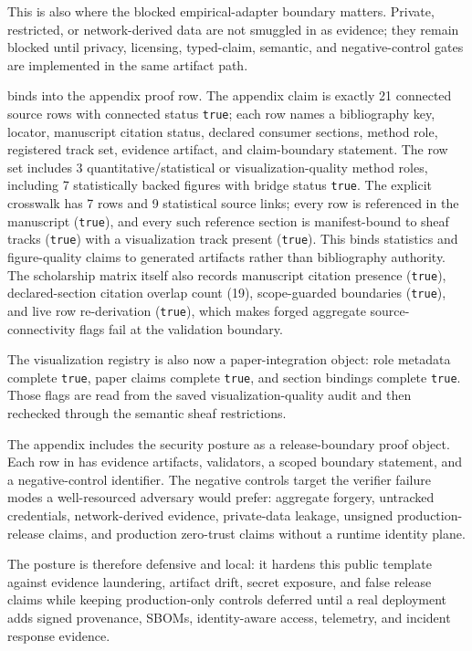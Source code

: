 \documentclass[
  english,
]{article}
\begin{document}
This is also where the blocked empirical-adapter boundary matters.
Private, restricted, or network-derived data are not smuggled in as
evidence; they remain blocked until privacy, licensing, typed-claim,
semantic, and negative-control gates are implemented in the same
artifact path.

 binds
 into the appendix
proof row. The appendix claim is exactly 21 connected source rows with
connected status \texttt{true}; each row names a bibliography key,
locator, manuscript citation status, declared consumer sections, method
role, registered track set, evidence artifact, and claim-boundary
statement. The row set includes 3 quantitative/statistical or
visualization-quality method roles, including 7 statistically backed
figures with bridge status \texttt{true}. The explicit crosswalk has 7
rows and 9 statistical source links; every row is referenced in the
manuscript (\texttt{true}), and every such reference section is
manifest-bound to sheaf tracks (\texttt{true}) with a visualization
track present (\texttt{true}). This binds statistics and figure-quality
claims to generated artifacts rather than bibliography authority. The
scholarship matrix itself also records manuscript citation presence
(\texttt{true}), declared-section citation overlap count (19),
scope-guarded boundaries (\texttt{true}), and live row re-derivation
(\texttt{true}), which makes forged aggregate source-connectivity flags
fail at the validation boundary.

The visualization registry is also now a paper-integration object: role
metadata complete \texttt{true}, paper claims complete \texttt{true},
and section bindings complete \texttt{true}. Those flags are read from
the saved visualization-quality audit and then rechecked through the
semantic sheaf restrictions.

The appendix includes the security posture as a release-boundary proof
object. Each row in
 has evidence
artifacts, validators, a scoped boundary statement, and a
negative-control identifier. The negative controls target the verifier
failure modes a well-resourced adversary would prefer: aggregate
forgery, untracked credentials, network-derived evidence, private-data
leakage, unsigned production-release claims, and production zero-trust
claims without a runtime identity plane.

The posture is therefore defensive and local: it hardens this public
template against evidence laundering, artifact drift, secret exposure,
and false release claims while keeping production-only controls deferred
until a real deployment adds signed provenance, SBOMs, identity-aware
access, telemetry, and incident response evidence.
\end{document}
